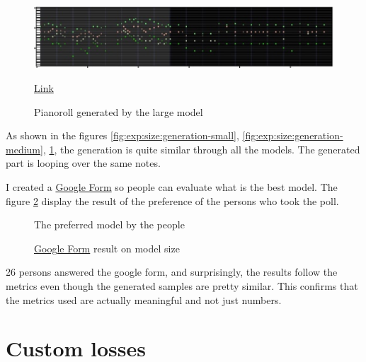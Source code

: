 \documentclass[12pt]{report}
\begin{document}
\begin{figure}[htbp]
    \centering
    \includegraphics[width=\textwidth]{images/experiences/size/generation-comparison-size-large.jpg}
    \caption{Pianoroll generated by the large model}
    \href{https://github.com/ValentinVignal/midiGenerator/blob/master/samples/mode-size-comparison/large.mid}{Link}
    \label{fig:exp:size:generation-large}
\end{figure}

As shown in the figures \ref{fig:exp:size:generation-small}, \ref{fig:exp:size:generation-medium}, \ref{fig:exp:size:generation-large}, the generation is quite similar through all the models.
The generated part is looping over the same notes.


I created a \href{https://docs.google.com/forms/d/e/1FAIpQLSdBn0DZZe-8YPvLYl-vovapk1iMnteeLzGfFJ7R00D3eA-Ydw/viewform?usp=sf_link}{Google Form} so people can evaluate what is the best model.
The figure \ref{fig:pie:size} display the result of the preference of the persons who took the poll.

\begin{figure}
    \begin{center}
    \caption{\href{https://docs.google.com/forms/d/e/1FAIpQLSdBn0DZZe-8YPvLYl-vovapk1iMnteeLzGfFJ7R00D3eA-Ydw/viewform?usp=sf_link}{Google Form} result on model size}
    The preferred model by the people
    \label{fig:pie:size}
    \end{center}
\end{figure}

26 persons answered the google form, and surprisingly, the results follow the metrics even though the generated samples are pretty similar.
This confirms that the metrics used are actually meaningful and not just numbers.

\section{Custom losses}
\end{document}

